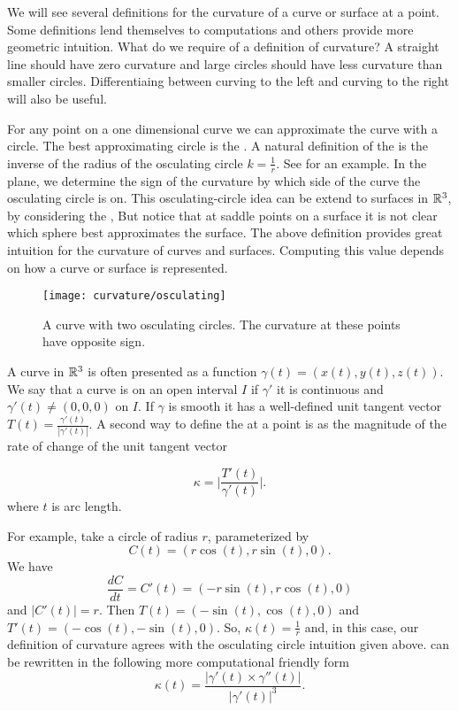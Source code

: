 

We will see several definitions for the  curvature of a curve or surface at a point.
Some definitions lend themselves to computations and others provide
more geometric intuition.
What  do we require of a definition of curvature?
A straight line should have zero curvature and
 large circles should have less curvature than smaller circles.
Differentiaing between
curving to the left and curving to the right will also be useful.

For any point on a one dimensional curve
we can approximate the curve with a circle.
The best approximating circle is the  .
A natural definition of the  is the inverse of the radius of the osculating
 circle $k=\frac{1}{r}$.
See  for an example.
In the plane, we determine the sign of the curvature by which side of the curve the osculating circle is on.
 This osculating-circle idea can be extend
to  surfaces in $\mathbb{R}^3$, by considering the ,
But notice that at saddle points on a surface it is not clear which sphere
best approximates the surface.
The above definition provides great intuition for the curvature of curves
and surfaces.
Computing this value depends on how a curve or surface is represented. 

\begin{figure}[htb]
	\centering
	\texttt{[image: curvature/osculating]}
	\caption{A curve with two osculating circles. The curvature at these points
	have opposite sign.}
	\label{fig:osculating-circle}
\end{figure}

A curve in $\mathbb{R}^3$ is often presented as a function
$\gamma(t)=(x(t),y(t),z(t))$. We say that a curve is  on an open interval $I$
if $\gamma'$ it is continuous and $\gamma'(t)\neq (0,0,0)$ on $I$. 
If $\gamma$ is smooth it has a well-defined unit tangent vector $T(t)=\frac{\gamma'(t)}{|\gamma'(t)|}.$
A second way to define the   at a point is as the magnitude of the rate of change of the 
unit tangent vector

\begin{equation} \label{eqn:kappa}
\kappa=\bigg  | \frac{T'(t)}{\gamma'(t)}\bigg |.
\end{equation}
where $t$ is arc length.

For example, take a circle of radius $r$, parameterized by 
$$C(t)=\left(r\cos(t),r\sin(t),0\right).$$
We have 
$$\frac{dC}{dt}=C'(t)=\left(-r\sin(t),r\cos(t),0\right)$$ and $|C'(t)|=r.$
Then $T(t)=\left(-\sin(t),\cos(t),0\right)$ and
$T'(t)=\left(-\cos(t),-\sin(t),0\right)$.
So, $\kappa(t)=\frac{1}{r}$ and, in this case, our definition of curvature agrees with the
osculating circle intuition given above. 
 can be rewritten in the following more computational friendly form 
\begin{equation} \label{eqn:kappa1}
\kappa(t)=\frac{|\gamma'(t)\times \gamma''(t)|}{|\gamma'(t)|^3}.
\end{equation}

